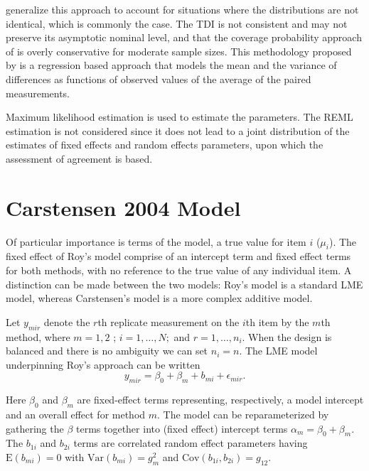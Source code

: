 \documentclass[12pt, a4paper]{report}
\theoremstyle{plain}
\theoremstyle{definition}
\theoremstyle{remark}
\begin{document}
\citet{pkcng} generalize this approach to account for situations
where the distributions are not identical, which is commonly the
case. The TDI is not consistent and may not preserve its
asymptotic nominal level, and that the coverage probability
approach of \citet{lin2002} is overly conservative for moderate
sample sizes. This methodology proposed by \citet{pkcng} is a
regression based approach that models the mean and the variance of
differences as functions of observed values of the average of the
paired measurements.

Maximum likelihood estimation is used to estimate the parameters.
The REML estimation is not considered since it does not lead to a
joint distribution of the estimates of fixed effects and random
effects parameters, upon which the assessment of agreement is
based.





\section{Carstensen 2004 Model}

Of particular importance is terms of the model, a true value for item $i$ ($\mu_{i}$).  The fixed effect of Roy's model comprise of an intercept term and fixed effect terms for both methods, with no reference to the true value of any individual item. A distinction can be made between the two models: Roy's model is a standard LME model, whereas Carstensen's model is a more complex additive model.


Let $y_{mir} $ denote the $r$th replicate measurement on the $i$th item by the $m$th method, where $m=1,2$ ; $i=1,\ldots,N;$ and $r = 1,\ldots,n_i.$ When the design is balanced and there is no ambiguity we can set $n_i=n.$ The LME model underpinning Roy's approach can be written
\begin{equation}\label{Roy-model}
y_{mir} = \beta_{0} + \beta_{m} + b_{mi} + \epsilon_{mir}.
\end{equation}

Here $\beta_0$ and $\beta_m$ are fixed-effect terms representing, respectively, a model intercept and an overall effect for method $m.$ The model can be reparameterized by gathering the $\beta$ terms together into (fixed effect) intercept terms $\alpha_m=\beta_0+\beta_m.$ The $b_{1i}$ and $b_{2i}$ terms are correlated random effect parameters having $\mathrm{E}(b_{mi})=0$ with $\mathrm{Var}(b_{mi})=g^2_m$ and $\mathrm{Cov}(b_{1i}, b_{2 i})=g_{12}.$ 
\end{document}
